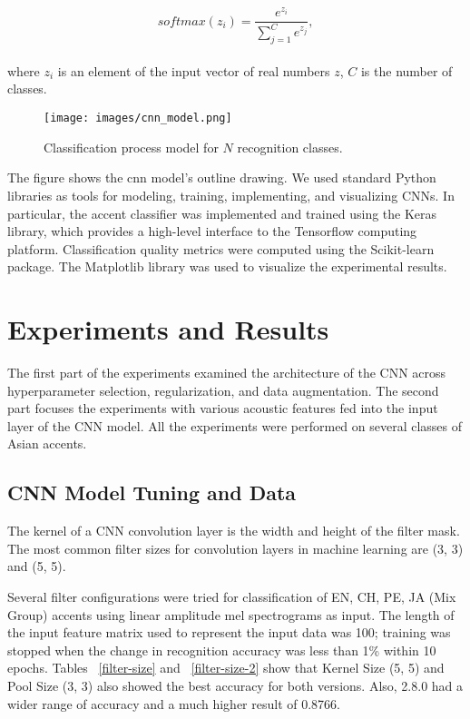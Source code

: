 \documentclass[ams]{U-AizuGT}
\begin{document}
\begin{equation}
softmax(z_i)=\frac{e^{z_i}}{\sum\nolimits_{j=1}^{C} e^{z_j}},
\end{equation}
\\
where $z_i$ is an element of the input vector of real numbers $z$, $C$ is the number of classes.

\begin{figure}[h]
    \centering
    \texttt{[image: images/cnn\_model.png]}
    \caption{Classification process model for $N$ recognition classes.}
    \label{cnn-model}
\end{figure}

The figure \label{cnn-model} shows the cnn model's outline drawing.
We used standard Python libraries as tools for modeling, training, implementing, and visualizing CNNs. In particular, the accent classifier was implemented and trained using the Keras library, which provides a high-level interface to the Tensorflow computing platform. Classification quality metrics were computed using the Scikit-learn package. The Matplotlib library was used to visualize the experimental results.

\section{Experiments and Results}
\label{sec:experiments-and-results}
The first part of the experiments examined the architecture of the CNN across hyperparameter selection, regularization, and data augmentation. The second part focuses the experiments with various acoustic features fed into the input layer of the CNN model. All the experiments were performed on several classes of Asian accents.
\subsection{CNN Model Tuning and Data }
The kernel of a CNN convolution layer is the width and height of the filter mask. The most common filter sizes for convolution layers in machine learning are (3, 3) and (5, 5).\par
Several filter configurations were tried for classification of {EN, CH, PE, JA} (Mix Group) accents using linear amplitude mel spectrograms as input. The length of the input feature matrix used to represent the input data was 100; training was stopped when the change in recognition accuracy was less than 1\% within 10 epochs. Tables ~\ref{filter-size} and ~\ref{filter-size-2} show that Kernel Size (5, 5) and Pool Size (3, 3) also showed the best accuracy for both versions. Also, 2.8.0 had a wider range of accuracy and a much higher result of 0.8766.
\end{document}
